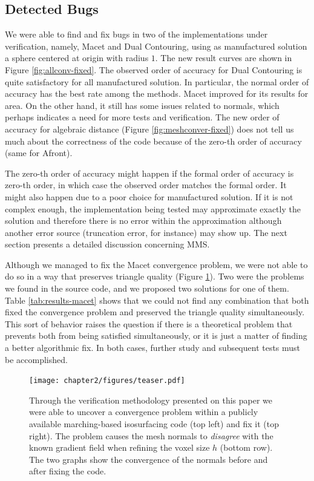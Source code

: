 \subsection{Detected Bugs}

We were able to find and fix bugs in two of the implementations 
under verification, namely, Macet and Dual Contouring, using as  
manufactured solution a sphere centered at origin with radius $1$. 
The new result curves are shown in Figure \ref{fig:allconv-fixed}. The observed 
order of accuracy for Dual Contouring is quite satisfactory for all manufactured 
solution. In particular, the normal order of accuracy has the best rate among the 
methods. Macet improved for its results for area. On the other hand, it still has 
some issues related to normals, which perhaps indicates a need for more tests 
and verification. The new order of accuracy for algebraic 
distance (Figure \ref{fig:meshconver-fixed}) does not tell us 
much about the correctness of the code because of the zero-th order 
of accuracy (same for Afront). 

The zero-th order of accuracy might happen if the formal order of accuracy 
is zero-th order, in which case the observed order matches the formal order. 
It might also happen due to a poor choice for manufactured solution. If 
it is not complex enough, the implementation being tested may approximate 
exactly the solution and therefore there is no error within the approximation 
although another error source (truncation error, for instance) may show up. 
The next section presents a detailed discussion concerning MMS.

Although we managed to fix the Macet convergence problem, we were not 
able to do so in a way that preserves triangle quality (Figure \ref{fig:teaser}).
Two were the problems we found in the source code, and we proposed two 
solutions for one of them. Table \ref{tab:results-macet} shows that we could 
not find any combination that both fixed the convergence problem and preserved the 
triangle quality simultaneously. This sort of behavior raises the question if there 
is a theoretical problem that prevents both from being satisfied simultaneously, 
or it is just a matter of finding a better algorithmic fix. 
In both cases, further study and subsequent tests must be accomplished.

\begin{figure}[b]
\centering
\texttt{[image: chapter2/figures/teaser.pdf]}
\caption{Through the verification methodology presented on this paper 
we were able to uncover a convergence problem within a publicly available marching-based 
isosurfacing code (top left) and fix it (top right). The problem causes the mesh normals to 
\emph{disagree} with the known gradient field when refining the voxel size $h$ (bottom row). 
The two graphs show the convergence of the normals before and after fixing the code.}
\label{fig:teaser}
\end{figure}

